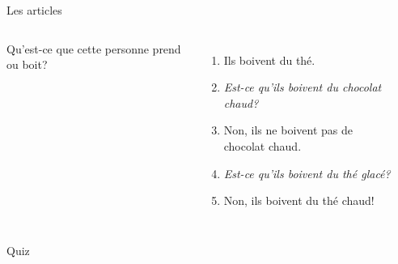\documentclass{beamer}
\begin{document}
  \begin{frame}{Les articles}
    \begin{columns}
        Qu'est-ce que cette personne prend ou boit?
        \begin{enumerate}
          \item<2-> Ils boivent du thé.
          \item<2-> \emph{Est-ce qu'ils boivent du chocolat chaud?}
          \item<3-> Non, ils ne boivent pas de chocolat chaud.
          \item<3-> \emph{Est-ce qu'ils boivent du thé glacé?}
          \item<4-> Non, ils boivent du thé chaud!
        \end{enumerate}
        \begin{minipage}[c][0.6\textwidth]{\linewidth}
          \begin{center}
          \end{center}
        \end{minipage}
    \end{columns}
  \end{frame}

  \begin{frame}{}
    \begin{center}
      \Large Quiz
    \end{center}
  \end{frame}
\end{document}
